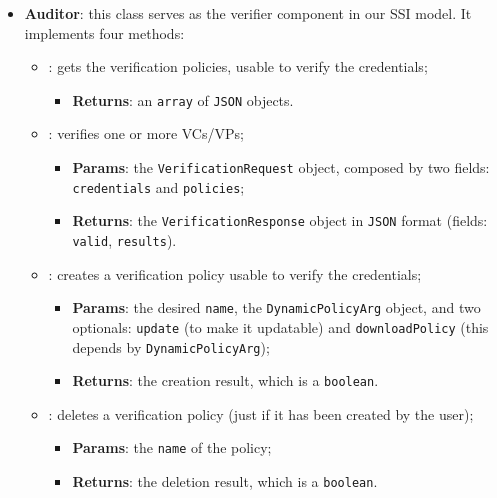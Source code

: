 \begin{itemize}
    \item \textbf{Auditor}: this class serves as the verifier component in our
    SSI model. It implements four methods:
    \begin{itemize}
        \setlength{\itemsep}{0.4cm}
        \item[] : gets the verification policies, usable
        to verify the credentials;
        \begin{itemize}
            \item \textbf{Returns}: an \texttt{array} of \texttt{JSON} objects.
        \end{itemize}
        \item[] : verifies one or more VCs/VPs;
        \begin{itemize}
            \item \textbf{Params}: the \texttt{VerificationRequest} object, composed by two fields:
            \texttt{credentials} and \texttt{policies};
            \item \textbf{Returns}: the \texttt{VerificationResponse}  object 
            in \texttt{JSON} format (fields: \texttt{valid}, \texttt{results}).
        \end{itemize}
        \item[] : creates a verification policy
        usable to verify the credentials;
        \begin{itemize}
            \item \textbf{Params}: the desired \texttt{name}, the \texttt{DynamicPolicyArg} object,
            and two optionals: \texttt{update} (to make it updatable) and 
            \texttt{downloadPolicy} (this depends by \texttt{DynamicPolicyArg});
            \item \textbf{Returns}: the creation result, which is a \texttt{boolean}.
        \end{itemize}
        \item[] : deletes a verification policy (just
        if it has been created by the user);
        \begin{itemize}
            \item \textbf{Params}: the \texttt{name} of the policy;
            \item \textbf{Returns}: the deletion result, which is a \texttt{boolean}.
        \end{itemize}
    \end{itemize}


\end{itemize}
